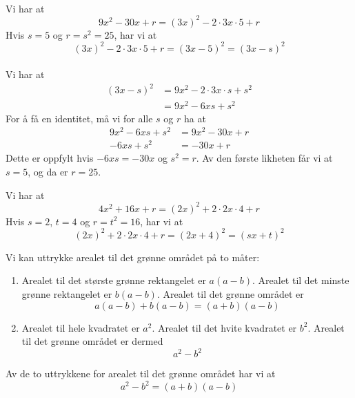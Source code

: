  \\
Vi har at
\[ 9x^2-30x+r = (3x)^2-2\cdot3x\cdot5+r \]
Hvis $s=5$ og $r=s^2=25$, har vi at
\[ (3x)^2-2\cdot3x\cdot5+r=(3x-5)^2=(3x-s)^2 \]
 \\
Vi har at
\begin{align*}
	(3x-s)^2&=9x^2-2\cdot3x\cdot s+s^2 \\
	&=9x^2-6xs+s^2
\end{align*}
For å få en identitet, må vi for alle $s$ og $r$ ha at
\begin{align*}
	9x^2-6xs+s^2 &= 9x^2-30x+r \\
	-6xs+s^2 &= -30x+r 
\end{align*}
Dette er oppfylt hvis $-6xs=-30x$ og $s^2=r$. Av den første likheten får vi at $s=5$, og da er $r=25$. \vsk

Vi har at
\[ 4x^2+16x+r=(2x)^2+2\cdot2x\cdot4+r \]
Hvis $s=2$, $t=4$ og $r=t^2=16$, har vi at
\[ (2x)^2+2\cdot2x\cdot4+r =(2x+4)^2=(sx+t)^2 \]


\newpage	

Vi kan uttrykke arealet til det grønne området på to måter:
\begin{enumerate}
	\item Arealet til det største grønne rektangelet er $a(a-b)$. Arealet til det minste grønne rektangelet er $b(a-b)$. Arealet til det grønne området er
	\[ a(a-b)+b(a-b)=(a+b)(a-b) \]
	\item Arealet til hele kvadratet er $a^2$. Arealet til det hvite kvadratet er $b^2$. Arealet til det grønne området er dermed
	\[ a^2-b^2 \]
\end{enumerate}
Av de to uttrykkene for arealet til det grønne området har vi at
\[ a^2-b^2=(a+b)(a-b) \]

